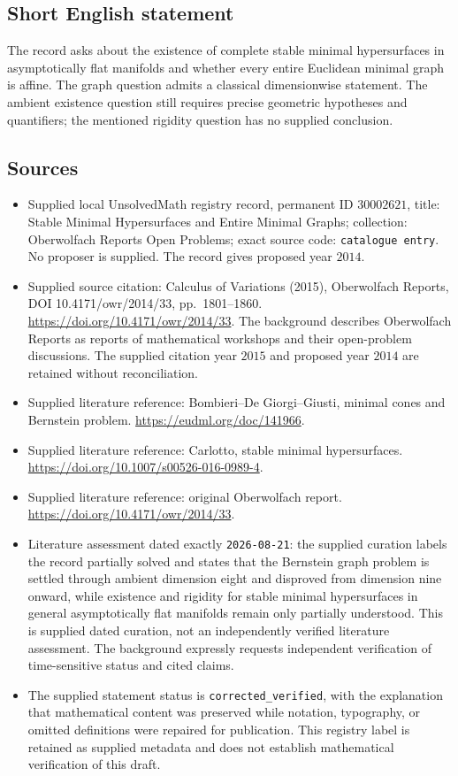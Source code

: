 \documentclass[11pt]{article}
\begin{document}
\subsection{Short English statement}
The record asks about the existence of complete stable minimal hypersurfaces in asymptotically flat manifolds and whether every entire Euclidean minimal graph is affine. The graph question admits a classical dimensionwise statement. The ambient existence question still requires precise geometric hypotheses and quantifiers; the mentioned rigidity question has no supplied conclusion.
\subsection{Sources}
\begin{itemize}
\item Supplied local UnsolvedMath registry record, permanent ID $30002621$, title: Stable Minimal Hypersurfaces and Entire Minimal Graphs; collection: Oberwolfach Reports Open Problems; exact source code: \texttt{catalogue entry}. No proposer is supplied. The record gives proposed year $2014$.
\item Supplied source citation: Calculus of Variations (2015), Oberwolfach Reports, DOI 10.4171/owr/2014/33, pp.\ 1801--1860. \url{https://doi.org/10.4171/owr/2014/33}. The background describes Oberwolfach Reports as reports of mathematical workshops and their open-problem discussions. The supplied citation year $2015$ and proposed year $2014$ are retained without reconciliation.
\item Supplied literature reference: Bombieri--De Giorgi--Giusti, minimal cones and Bernstein problem. \url{https://eudml.org/doc/141966}.
\item Supplied literature reference: Carlotto, stable minimal hypersurfaces. \url{https://doi.org/10.1007/s00526-016-0989-4}.
\item Supplied literature reference: original Oberwolfach report. \url{https://doi.org/10.4171/owr/2014/33}.
\item Literature assessment dated exactly \texttt{2026-08-21}: the supplied curation labels the record partially solved and states that the Bernstein graph problem is settled through ambient dimension eight and disproved from dimension nine onward, while existence and rigidity for stable minimal hypersurfaces in general asymptotically flat manifolds remain only partially understood. This is supplied dated curation, not an independently verified literature assessment. The background expressly requests independent verification of time-sensitive status and cited claims.
\item The supplied statement status is \texttt{corrected\_verified}, with the explanation that mathematical content was preserved while notation, typography, or omitted definitions were repaired for publication. This registry label is retained as supplied metadata and does not establish mathematical verification of this draft.
\end{itemize}
\end{document}
